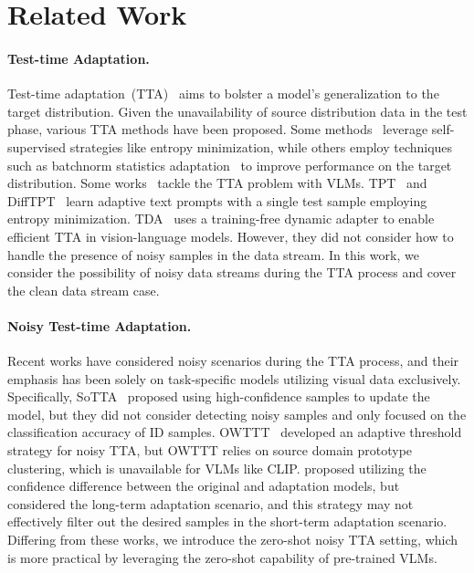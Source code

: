 \section{Related Work}
\paragraph{Test-time Adaptation.}
Test-time adaptation~(TTA)~\citep{wang2021tent, liang2023ttasurvey, niu2022efficient, fleuret2021test, boudiaf2022parameter, prabhudesai2023diffusion, lee2024entropy, gui2024atta} aims to bolster a model's generalization to the target distribution. 
Given the unavailability of source distribution data in the test phase, various TTA methods have been proposed. Some methods~\citep{wang2021tent, niu2022efficient, fleuret2021test} leverage self-supervised strategies like entropy minimization, while others employ techniques such as batchnorm statistics adaptation~\citep{schneider2020improving, nado2020evaluating} to improve performance on the target distribution.
Some works~\citep{shu2022test, feng2023diverse, karmanov2024efficient, samadh2023align, ma2024swapprompt, zhao2024testtime, yoon2024ctpt} tackle the TTA problem with VLMs. TPT~\citep{shu2022test} and DiffTPT~\citep{feng2023diverse} learn adaptive text prompts with a single test sample employing entropy minimization. TDA~\citep{karmanov2024efficient} uses a training-free dynamic adapter to enable efficient TTA in vision-language models. However, they did not consider how to handle the presence of noisy samples in the data stream. In this work, we consider the possibility of noisy data streams during the TTA process and cover the clean data stream case.

\paragraph{Noisy Test-time Adaptation.}
Recent works have considered noisy scenarios during the TTA process, and their emphasis has been solely on task-specific models utilizing visual data exclusively. Specifically, SoTTA~\citep{gong2023sotta} proposed using high-confidence samples to update the model, but they did not consider detecting noisy samples and only focused on the classification accuracy of ID samples. OWTTT~\citep{li2023robustness} developed an adaptive threshold strategy for noisy TTA, but OWTTT relies on source domain prototype clustering, which is unavailable for VLMs like CLIP. \citet{lee2023towards} proposed utilizing the confidence difference between the original and adaptation models, but ~\citet{lee2023towards} considered the long-term adaptation scenario, and this strategy may not effectively filter out the desired samples in the short-term adaptation scenario. Differing from these works, we introduce the zero-shot noisy TTA setting, which is more practical by leveraging the zero-shot capability of pre-trained VLMs.



